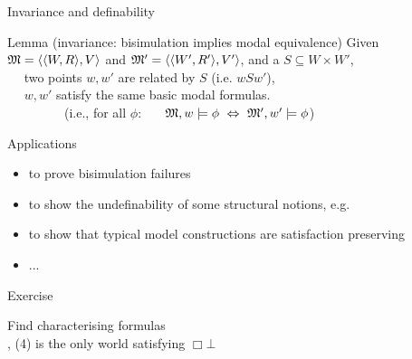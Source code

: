 \documentclass{beamer}
\begin{document}
\begin{slide}{Invariance and definability}\label{s:31}
\small
\begin{block}{Lemma (invariance: bisimulation implies modal equivalence)}
Given  $\mathfrak{M} = \mathopen{\langle}\mathopen{\langle}W, R\mathclose{\rangle}, V\mathclose{\rangle}$ and $\mathfrak{M}' = \mathopen{\langle}\mathopen{\langle}W', R'\mathclose{\rangle}, V'\mathclose{\rangle}$, and a  
$S \subseteq W \times W'$,\\
~~ two points $w, w'$ are related by $S$ (i.e. $w S w'$),\\
~~ $w, w'$  satisfy the same basic modal formulas.\\
~~~~~~~~~\textcolor{black!50}{(i.e., for all $\phi$:
  ~~~$\mathfrak{M},w \models \phi ~\Leftrightarrow~ \mathfrak{M}',w' \models \phi$)}
 \end{block}
\begin{block}{Applications}
\begin{itemize}
\item to prove bisimulation failures
\item to show the undefinability of some structural notions, e.g. 
\item  to show that typical model constructions are satisfaction preserving
\item ...
\end{itemize}
\end{block}
\end{slide}


\begin{frame}{Exercise}
\begin{exampleblock}{Find characterising formulas}
\centering
{}
~~~~~~~~~~~
\\[4mm]
\eg, (4) is the only world satisfying $\Box\bot$
\end{exampleblock}
\end{frame}
\end{document}
